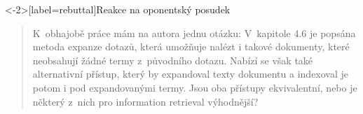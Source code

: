 \documentclass[aspectratio=169,t]{beamer}
\begin{document}
\begin{frame}<-2>[label=rebuttal]{Reakce na oponentský posudek}
\begin{quote}
K~obhajobě práce mám na autora jednu otázku: V~kapitole 4.6 je popsána \alert<1>{metoda
expanze dotazů}, která umožňuje nalézt i takové dokumenty, které neobsahují
žádné termy z~původního dotazu. Nabízí se však také \alert<1>{alternativní přístup},
\alert<1>{který by expandoval texty dokumentu} a indexoval je potom i pod
expandovanými termy. \alert<1>{Jsou oba přístupy ekvivalentní}, nebo je některý
z~nich pro information retrieval výhodnější?
\end{quote}
\end{frame}
\end{document}

